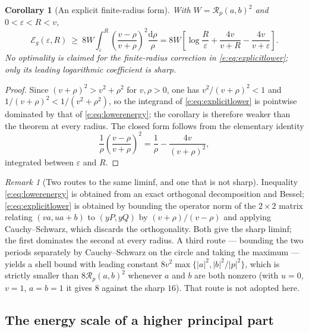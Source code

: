 \documentclass[11pt,a4paper]{article}
\numberwithin{equation}{section}
\newtheorem{corollary}[theorem]{Corollary}
\theoremstyle{definition}
\theoremstyle{remark}
\newtheorem{remark}[theorem]{Remark}
\theoremstyle{plain}
\newcommand{\Rp}{\mathcal R_{p}}      %
\newcommand{\Eg}{\mathcal E_{g}}
\newcommand{\abs}[1]{\lvert #1\rvert}
\newcommand{\dd}{\mathrm d}
\begin{document}
\begin{corollary}[An explicit finite-radius form]
\label{e:cor:explicitlower}
With $W=\Rp(a,b)^2$ and $0<\varepsilon<R<v$,
\begin{equation}
 \Eg(\varepsilon,R)\ \ge\
 8W\int_\varepsilon^R\left(\frac{v-\rho}{v+\rho}\right)^2\frac{\dd\rho}\rho
 =8W\left[\log\frac R\varepsilon+\frac{4v}{v+R}-\frac{4v}{v+\varepsilon}
  \right].
 \label{e:eq:explicitlower}
\end{equation}
No optimality is claimed for the finite-radius correction in
\eqref{e:eq:explicitlower}; only its leading logarithmic coefficient is
sharp.
\end{corollary}

\begin{proof}
Since $(v+\rho)^2>v^2+\rho^2$ for $v,\rho>0$, one has
$v^2/(v+\rho)^2<1$ and $1/(v+\rho)^2<1/(v^2+\rho^2)$, so the integrand of
\eqref{e:eq:explicitlower} is pointwise dominated by that of
\eqref{e:eq:lowerenergy}; the corollary is therefore weaker than the
theorem at every radius. The closed form follows from the elementary
identity
\[
 \frac1\rho\left(\frac{v-\rho}{v+\rho}\right)^2
 =\frac1\rho-\frac{4v}{(v+\rho)^2},
\]
integrated between $\varepsilon$ and $R$.
\end{proof}

\begin{remark}[Two routes to the same liminf, and one that is not sharp]
Inequality \eqref{e:eq:lowerenergy} is obtained from an exact orthogonal
decomposition and Bessel; \eqref{e:eq:explicitlower} is obtained by
bounding the operator norm of the $2\times2$ matrix relating
$(va,ua+b)$ to $(yP,yQ)$ by $(v+\rho)/(v-\rho)$ and applying
Cauchy--Schwarz, which discards the orthogonality. Both give the sharp
liminf; the first dominates the second at every radius. A third route
--- bounding the two periods separately by Cauchy--Schwarz on the circle
and taking the maximum --- yields a shell bound with leading constant
$8v^2\max\{\abs a^2,\abs b^2/\abs p^2\}$, which is strictly smaller than
$8\Rp(a,b)^2$ whenever $a$ and $b$ are both nonzero (with $u=0$, $v=1$,
$a=b=1$ it gives $8$ against the sharp $16$). That route is not adopted
here.
\end{remark}

\subsection{The energy scale of a higher principal part}
\label{e:sec:poleenergy}
\end{document}
